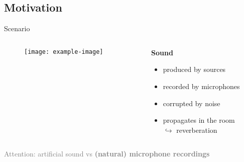 \subsection{Motivation}

\begin{frame}{Scenario}

    \begin{columns}[onlytextwidth]
        \begin{column}{0.69\textwidth}
            \begin{figure}
                \texttt{[image: example-image]}
            \end{figure}
        \end{column}
        \begin{column}{0.29\textwidth}
            \textbf{Sound}
            \begin{itemize}
                \item produced by \alert{sources}
                \item recorded by \alert{microphones}
                \item corrupted by \alert{noise}
                \item  propagates in the \alert{room}
                    \\$\hookrightarrow$ \alert{reverberation}
            \end{itemize}
        \end{column}
    \end{columns}

    \vfill
    \textcolor{gray}{Attention: artificial sound vs \textbf{(natural) microphone recordings}}

\end{frame}


